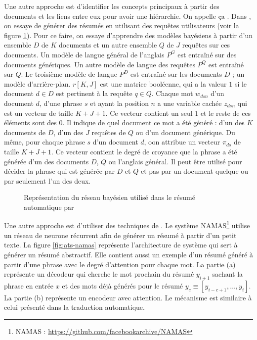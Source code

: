 \documentclass{KodeBook}
\begin{document}
Une autre approche est d'identifier les concepts principaux à partir des documents et les liens entre eux pour avoir une hiérarchie. 
On appelle ça . 
Dans \cite{06-daumeiii-marcu}, on essaye de générer des résumés en utilisant des requêtes utilisateurs (voir la figure \ref{fig:ats-daumeii-marcu}). 
Pour ce faire, on essaye d'apprendre des modèles bayésiens à partir d'un ensemble $D$ de $K$ documents et un autre ensemble $Q$ de $J$ requêtes sur ces documents. 
Un modèle de langue général de l'anglais $P^G$ est entraîné sur des documents génériques.
Un autre modèle de langue des requêtes $P^Q$ est entraîné sur $Q$. 
Le troisième modèle de langue $P^D$ est entraîné sur les documents $D$ ; un modèle d'arrière-plan.
$r[K, J]$ est une matrice booléenne, qui a la valeur $1$ si le document $d \in D$ est pertinent à la requête $q \in Q$. 
Chaque mot $w_{dsn}$ d'un document $d$, d'une phrase $s$ et ayant la position $n$ a une variable cachée $z_{dsn}$ qui est un vecteur de taille $K+J+1$. 
Ce vecteur contient un seul $1$ et le reste de ces éléments sont des $0$.
Il indique de quel document ce mot a été généré : d'un des $K$ documents de $D$, d'un des $J$ requêtes de $Q$ ou d'un document générique.
Du même, pour chaque phrase $s$ d'un document $d$, oon attribue un vecteur $\pi_{ds}$ de taille $K+J+1$. 
Ce vecteur contient le degré de croyance que la phrase a été générée d'un des documents $D$, $Q$ ou l'anglais général.
Il peut être utilisé pour décider la phrase qui est générée par $D$ et $Q$ et pas par un document quelque ou par seulement l'un des deux.

\begin{figure}[!ht]
	\centering
	\caption{Représentation du réseau bayésien utilisé dans le résumé automatique par \citet{06-daumeiii-marcu}}
	\label{fig:ats-daumeii-marcu}
\end{figure}

Une autre approche est d'utiliser des techniques de . 
Le système NAMAS\footnote{NAMAS : \url{https://github.com/facebookarchive/NAMAS}} \cite{15-rush-al} utilise un réseau de neurone récurrent afin de générer un résumé à partir d'un petit texte. 
La figure \ref{fig:ats-namas} représente l'architecture de système qui sert à générer un résumé abstractif. 
Elle contient aussi un exemple d'un résumé généré à partir d'une phrase avec le degré d'attention pour chaque mot.
La partie (a) représente un décodeur qui cherche le mot prochain du résumé $y_{i+1}$ sachant la phrase en entrée $x$ et des mots déjà générés pour le résumé $y_c \equiv [y_{i-c+1},\ldots, y_i]$. 
La partie (b) représente un encodeur avec attention. 
Le mécanisme est similaire à celui présenté dans la traduction automatique.
\end{document}
